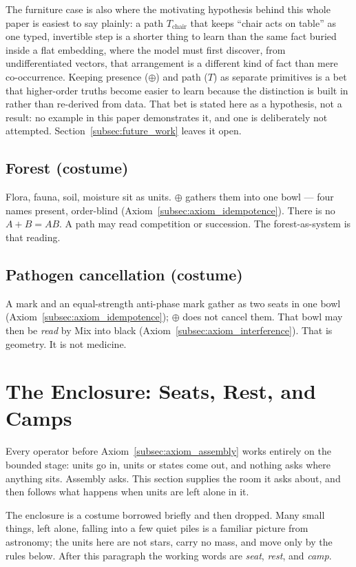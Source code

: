 \documentclass[12pt, a4paper]{article}
\begin{document}
The furniture case is also where the motivating hypothesis behind
this whole paper is easiest to say plainly: a path $T_{\mathrm{chair}}$
that keeps ``chair acts on table'' as one typed, invertible step is a
shorter thing to learn than the same fact buried inside a flat
embedding, where the model must first discover, from undifferentiated
vectors, that arrangement is a different kind of fact than mere
co-occurrence. Keeping presence ($\oplus$) and path ($T$) as separate
primitives is a bet that higher-order truths become easier to learn
because the distinction is built in rather than re-derived from data.
That bet is stated here as a hypothesis, not a result: no example in
this paper demonstrates it, and one is deliberately not attempted.
Section~\ref{subsec:future_work} leaves it open.

\subsection{Forest (costume)}
Flora, fauna, soil, moisture sit as units. $\oplus$ gathers them into
one bowl --- four names present, order-blind
(Axiom~\ref{subsec:axiom_idempotence}).
There is no $A+B=AB$. A path may read competition or succession.
The forest-as-system is that reading.

\subsection{Pathogen cancellation (costume)}
A mark and an equal-strength anti-phase mark gather as two seats in
one bowl (Axiom~\ref{subsec:axiom_idempotence}); $\oplus$ does not
cancel them. That bowl may then be \emph{read} by Mix into black
(Axiom~\ref{subsec:axiom_interference}). That is geometry. It is not
medicine.

\section{The Enclosure: Seats, Rest, and Camps}
\label{sec:enclosure}

Every operator before Axiom~\ref{subsec:axiom_assembly} works
entirely on the bounded stage: units go in, units or states come
out, and nothing asks where anything sits. Assembly asks. This
section supplies the room it asks about, and then follows what
happens when units are left alone in it.

The enclosure is a costume borrowed briefly and then dropped. Many
small things, left alone, falling into a few quiet piles is a
familiar picture from astronomy; the units here are not stars, carry
no mass, and move only by the rules below. After this paragraph the
working words are \emph{seat}, \emph{rest}, and \emph{camp}.
\end{document}
